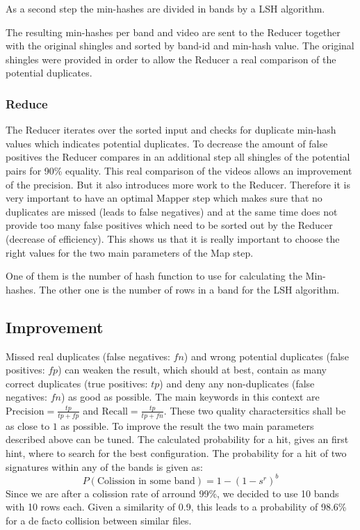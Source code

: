 \documentclass[a4paper, 11pt]{article}
\begin{document}
As a second step the min-hashes are divided in bands by a LSH algorithm.

The resulting min-hashes per band and video are sent to the Reducer together with the original shingles and sorted by band-id and min-hash value. The original shingles were provided in order to allow the Reducer a real comparison of the potential duplicates.

\subsubsection{Reduce}

The Reducer iterates over the sorted input and checks for duplicate min-hash values which indicates potential duplicates. To decrease the amount of false positives the Reducer compares in an additional step all shingles of the potential pairs for 90\% equality. This real comparison of the videos allows an improvement of the precision. But it also introduces more work to the Reducer. 
Therefore it is very important to have an optimal Mapper step which makes sure that no duplicates are missed (leads to false negatives) and at the same time does not provide too many false positives which need to be sorted out by the Reducer (decrease of efficiency).
This shows us that it is really important to choose the right values for the two main parameters of the Map step.

One of them is the number of hash function to use for calculating the Min-hashes.
The other one is the number of rows in a band for the LSH algorithm.


\subsection{Improvement}

Missed real duplicates (false negatives: $fn$) and wrong potential duplicates (false positives: $fp$) can weaken the result, which should at best, contain as many correct duplicates (true positives: $tp$) and deny any non-duplicates  (false negatives: $fn$) as good as possible. The main keywords in this context are $\text{Precision}=\frac{tp}{tp+fp}$ and $\text{Recall}=\frac{tp}{tp+fn}$. These two quality charactersitics shall be as close to $1$ as possible.
To improve the result the two main parameters described above can be tuned.
The calculated probability for a hit, gives an first hint, where to search for the best configuration. The probability for a hit of two signatures within any of the bands is given as:
\begin{equation*}P(\text{Colission in some band}) = 1 - (1-s^r)^b \end{equation*}
Since we are after a colission rate of arround 99\%, we decided to use 10 bands with 10 rows each. Given a similarity of 0.9, this leads to a probability of 98.6\% for a de facto collision between similar files.  
\end{document}
